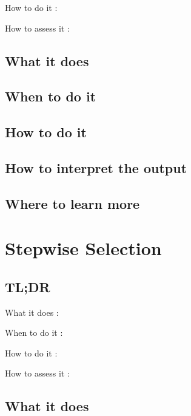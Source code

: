 \documentclass[
]{book}
\begin{document}
How to do it
:

How to assess it
:

\hypertarget{what-it-does-11}{%
\section{What it does}\label{what-it-does-11}}

\hypertarget{when-to-do-it-11}{%
\section{When to do it}\label{when-to-do-it-11}}

\hypertarget{how-to-do-it-11}{%
\section{How to do it}\label{how-to-do-it-11}}

\hypertarget{how-to-interpret-the-output-11}{%
\section{How to interpret the output}\label{how-to-interpret-the-output-11}}

\hypertarget{where-to-learn-more-11}{%
\section{Where to learn more}\label{where-to-learn-more-11}}

\hypertarget{stepwise-selection}{%
\chapter{Stepwise Selection}\label{stepwise-selection}}

\hypertarget{tldr-12}{%
\section{TL;DR}\label{tldr-12}}

What it does
:

When to do it
:

How to do it
:

How to assess it
:

\hypertarget{what-it-does-12}{%
\section{What it does}\label{what-it-does-12}}
\end{document}
